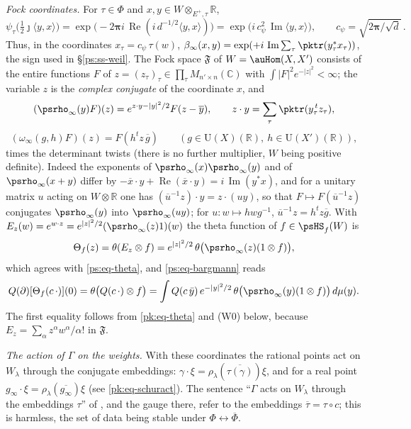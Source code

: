\documentclass[10pt]{amsart}
\theoremstyle{definition}
\theoremstyle{remark}
\newcommand{\C}{\mathbb C}
\newcommand{\R}{\mathbb R}
\newcommand{\Rel}{\operatorname{Re}}
\newcommand{\Iml}{\operatorname{Im}}
\providecommand{\auPl}{\Phi}
\providecommand{\auU}{\mathrm U}
\providecommand{\aubar}[1]{\overline{#1}}
\begin{document}
\emph{Fock coordinates.} For $\tau\in\auPl$ and $x,y\in W\otimes_{E^+,\tau}\R$,
\[
\psi_\tau\bigl(\tfrac12\jmath\langle y,x\rangle\bigr)=\exp\bigl(-2\boldsymbol\pi i\,\Rel(i\,d^{-1/2}
\langle y,x\rangle)\bigr)=\exp\bigl(i\,c_\psi^2\,\Iml\langle y,x\rangle\bigr),\qquad
c_\psi=\sqrt{2\boldsymbol\pi/\sqrt d}\,.
\]
Thus, in the coordinates $x_\tau=c_\psi\,\tau(w)$, $\beta_\infty(x,y)=\exp(+i\,\Iml\sum_\tau
\pktr(y_\tau^*x_\tau))$, the sign used in \S\ref{ps:ss-weil}. The Fock
space $\mathfrak F$ of $W=\auHom(X,X')$ consists of the entire functions $F$ of
$z=(z_\tau)_\tau\in\prod_\tau M_{n'\times n}(\C)$ with $\int|F|^2e^{-|z|^2}<\infty$; the variable
$z$ is the \emph{complex conjugate} of the coordinate $x$, and
\begin{equation}\label{pk:eq-fock}
(\psrho_\infty(y)F)(z)=e^{z\cdot y-|y|^2/2}F(z-\aubar y),\qquad z\cdot y=\sum_{\tau}\pktr(y_\tau^{\,t}
z_\tau),
\end{equation}
\[
(\omega_\infty(g,h)F)(z)=F(h^{t}z\,\aubar g)\qquad(g\in\auU(X)(\R),\ h\in\auU(X')(\R)),
\]
times the determinant twists (there is no further multiplier, $W$ being positive definite).
Indeed the exponents of $\psrho_\infty(x)\psrho_\infty(y)$ and of $\psrho_\infty(x+y)$ differ by
$-\aubar x\cdot y+\Rel(\aubar x\cdot y)=i\,\Iml(y^*x)$, and for a unitary matrix $u$ acting on $W
\otimes\R$ one has $(\aubar u^{-1}z)\cdot y=z\cdot(uy)$, so that $F\mapsto F(\aubar u^{-1}z)$
conjugates $\psrho_\infty(y)$ into $\psrho_\infty(uy)$; for $u\colon w\mapsto hwg^{-1}$,
$\aubar u^{-1}z=h^tz\aubar g$. With $E_z(w)=e^{w\cdot z}=e^{|z|^2/2}(\psrho_\infty(z)1)(w)$ the
theta function of $f\in\psHS_f(W)$ is
\begin{equation}\label{pk:eq-theta}
\Theta_f(z)=\theta(E_z\otimes f)=e^{|z|^2/2}\,\theta\bigl(\psrho_\infty(z)(1\otimes f)\bigr),
\end{equation}
which agrees with \eqref{ps:eq-theta}, and \eqref{ps:eq-bargmann} reads
\begin{equation}\label{pk:eq-bargmann}
Q(\partial)[\Theta_f(c\,\cdot)](0)=\theta\bigl(Q(c\,\cdot)\otimes f\bigr)=\int Q(c\,\bar y)\,
e^{-|y|^2/2}\,\theta\bigl(\psrho_\infty(y)(1\otimes f)\bigr)\,d\mu(y).
\end{equation}
The first equality follows from
\eqref{pk:eq-theta} and (W0) below, because $E_z=\sum_\alpha z^\alpha w^\alpha/\alpha!$ in
$\mathfrak F$.

\emph{The action of $\Gamma$ on the weights.} With these coordinates the rational points act on
$W_\lambda$ through the conjugate embeddings: $\gamma\cdot\xi=\rho_\lambda(\aubar{\tau(\gamma)})\xi$,
and for a real point $g_\infty\cdot\xi=\rho_\lambda(\aubar{g_\infty})\xi$ (see
\eqref{pk:eq-schuract}). The sentence ``$\Gamma$ acts on $W_\lambda$ through the embeddings $\tau$''
of {\cite[\S14.3]{P46}}, and the gauge there, refer to the embeddings $\aubar\tau=\tau\circ c$; this
is harmless, the set of data being stable under $\auPl\leftrightarrow\aubar\auPl$.
\end{document}
